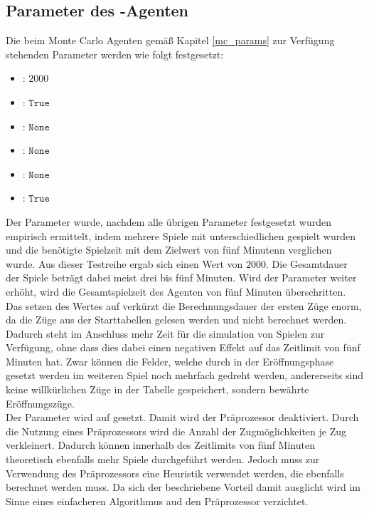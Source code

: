 \subsection*{Parameter des -Agenten}
\label{eval:agents:params:subsec-mc}
Die beim Monte Carlo Agenten gemäß Kapitel \ref{mc_params} zur Verfügung stehenden Parameter werden wie folgt festgesetzt:
\begin{itemize}
\item {}: $2000$
\item {}: $\mathtt{True}$
\item {}: $\mathtt{None}$
\item {}: $\mathtt{None}$
\item {}: $\mathtt{None}$
\item {}: $\mathtt{True}$
\end{itemize}
Der Parameter  wurde, nachdem alle übrigen Parameter festgesetzt wurden  empirisch ermittelt, indem mehrere Spiele mit unterschiedlichen  gespielt wurden und die benötigte Spielzeit mit dem Zielwert von fünf Minutenn verglichen wurde. Aus dieser Testreihe ergab sich einen  Wert von $2000$. Die Gesamtdauer der Spiele beträgt dabei meist drei bis fünf Minuten. Wird der Parameter weiter erhöht, wird die Gesamtspielzeit des Agenten von fünf Minuten überschritten.
\\Das setzen des Wertes auf  verkürzt die Berechnungsdauer der ersten Züge enorm, da die Züge aus der Starttabellen gelesen werden und nicht berechnet werden. Dadurch steht im Anschluss mehr Zeit für die simulation von Spielen zur Verfügung, ohne dass dies dabei einen negativen Effekt auf das Zeitlimit von fünf Minuten hat. Zwar können die Felder, welche durch in der Eröffnungsphase gesetzt werden im weiteren Spiel noch mehrfach gedreht werden, andererseits sind keine willkürlichen Züge in der Tabelle gespeichert, sondern bewährte Eröffnungszüge.
\\Der Parameter  wird auf  gesetzt. Damit wird der Präprozessor deaktiviert. Durch die Nutzung eines Präprozessors wird die Anzahl der Zugmöglichkeiten je Zug verkleinert. Dadurch können innerhalb des Zeitlimits von fünf Minuten theoretisch ebenfalls mehr Spiele durchgeführt werden. Jedoch muss zur Verwendung des Präprozessors eine Heuristik verwendet werden, die ebenfalls berechnet werden muss. Da sich der beschriebene Vorteil damit ausglicht wird im Sinne eines einfacheren Algorithmus aud den Präprozessor verzichtet.
